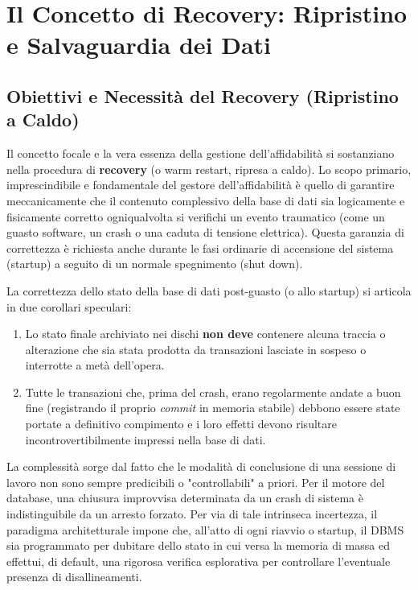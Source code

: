 \chapter{Il Concetto di Recovery: Ripristino e Salvaguardia dei Dati}

\section{Obiettivi e Necessità del Recovery (Ripristino a Caldo)}

Il concetto focale e la vera essenza della gestione dell'affidabilità si sostanziano nella procedura di \textbf{recovery} (o warm restart, ripresa a caldo). Lo scopo primario, imprescindibile e fondamentale del gestore dell'affidabilità è quello di garantire meccanicamente che il contenuto complessivo della base di dati sia logicamente e fisicamente corretto ogniqualvolta si verifichi un evento traumatico (come un guasto software, un crash o una caduta di tensione elettrica). Questa garanzia di correttezza è richiesta anche durante le fasi ordinarie di accensione del sistema (startup) a seguito di un normale spegnimento (shut down).

La correttezza dello stato della base di dati post-guasto (o allo startup) si articola in due corollari speculari:
\begin{enumerate}
    \item Lo stato finale archiviato nei dischi \textbf{non deve} contenere alcuna traccia o alterazione che sia stata prodotta da transazioni lasciate in sospeso o interrotte a metà dell'opera.
    \item Tutte le transazioni che, prima del crash, erano regolarmente andate a buon fine (registrando il proprio \textit{commit} in memoria stabile) debbono essere state portate a definitivo compimento e i loro effetti devono risultare incontrovertibilmente impressi nella base di dati.
\end{enumerate}

La complessità sorge dal fatto che le modalità di conclusione di una sessione di lavoro non sono sempre predicibili o "controllabili" a priori. Per il motore del database, una chiusura improvvisa determinata da un crash di sistema è indistinguibile da un arresto forzato. Per via di tale intrinseca incertezza, il paradigma architetturale impone che, all'atto di ogni riavvio o startup, il DBMS sia programmato per dubitare dello stato in cui versa la memoria di massa ed effettui, di default, una rigorosa verifica esplorativa per controllare l'eventuale presenza di disallineamenti.

